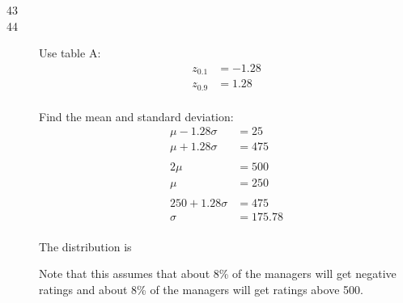\documentclass{exam}
\begin{document}
\begin{description}
      \item[43]

      \item[44]
        Use table A: 
        \begin{align*}
          z_{0.1} &= -1.28 \\
          z_{0.9} &= 1.28 \\
        \end{align*}

        Find the mean and standard deviation:
        \begin{align*}
          \mu - 1.28 \sigma &= 25 \\
          \mu + 1.28 \sigma &= 475 \\
          \\
          2 \mu & = 500 \\
          \mu   & = 250 \\
          \\
          250 + 1.28 \sigma & = 475 \\
          \sigma            & = 175.78 \\
        \end{align*}

        The distribution is 

        Note that this assumes that about 8\% of the managers will get negative
        ratings and about 8\% of the managers will get ratings above 500.


\end{description}
\end{document}
